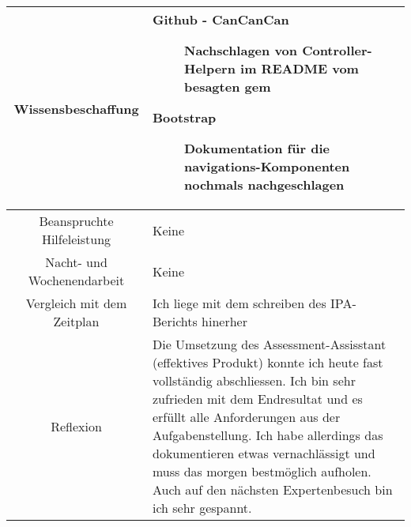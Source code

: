 \begin{tabularx}{\textwidth}[H]{|c|X|}
    Wissensbeschaffung         &
    \begin{description}
        \item[Github - CanCanCan] Nachschlagen von Controller-Helpern im README vom besagten gem
        \item[Bootstrap] Dokumentation für die navigations-Komponenten nochmals nachgeschlagen
    \end{description}
    \\ \hline

    Beanspruchte Hilfeleistung &
    Keine
    \\ \hline

    Nacht- und Wochenendarbeit &
    Keine
    \\ \hline

    Vergleich mit dem Zeitplan &
    Ich liege mit dem schreiben des IPA-Berichts hinerher
    \\ \hline

    Reflexion                  &
    Die Umsetzung des Assessment-Assisstant (effektives Produkt) konnte ich heute fast vollständig abschliessen. Ich bin sehr zufrieden mit dem Endresultat und es erfüllt alle Anforderungen aus der Aufgabenstellung.
    Ich habe allerdings das dokumentieren etwas vernachlässigt und muss das morgen bestmöglich aufholen. Auch auf den nächsten Expertenbesuch bin ich sehr gespannt.
    \\ \hline
\end{tabularx}
